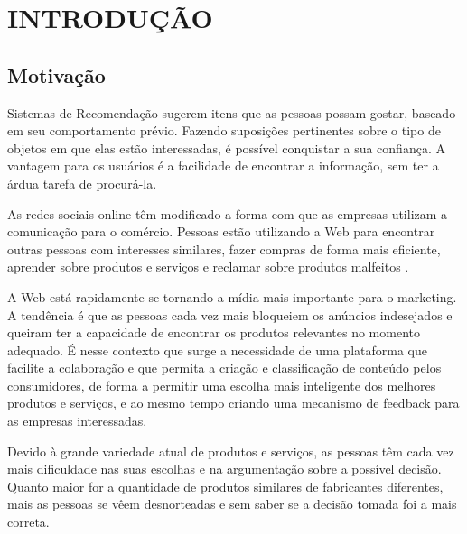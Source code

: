 \chapter{INTRODUÇÃO}  %

\section{Motivação} %
\label{sec:motivação}




 Sistemas de Recomendação sugerem itens que as pessoas possam gostar, baseado em seu comportamento prévio. Fazendo suposições pertinentes sobre o tipo de objetos em que elas estão interessadas, é possível conquistar a sua confiança. A vantagem para os usuários é a facilidade de encontrar a informação, sem ter a árdua tarefa de procurá-la.

 As redes sociais online têm modificado a forma com que as empresas utilizam a comunicação para o comércio. Pessoas estão utilizando a Web para encontrar outras pessoas com interesses similares, fazer compras de forma mais eficiente, aprender sobre produtos e serviços e reclamar sobre produtos malfeitos \cite{marketing_social_web}.

 A Web está rapidamente se tornando a mídia mais importante para o marketing. A tendência é que as pessoas cada vez mais bloqueiem os anúncios indesejados e queiram ter a capacidade de encontrar os produtos relevantes no momento adequado. É nesse contexto que surge a necessidade de uma plataforma que facilite a colaboração e que permita a criação e classificação de conteúdo pelos consumidores, de forma a permitir uma escolha mais inteligente dos melhores produtos e serviços, e ao mesmo tempo criando uma mecanismo de feedback para as empresas interessadas.

 Devido à grande variedade atual de produtos e serviços, as pessoas têm cada vez mais dificuldade nas suas escolhas e na argumentação sobre a possível decisão. Quanto maior for a quantidade de produtos similares de fabricantes diferentes, mais as pessoas se vêem desnorteadas e sem saber se a decisão tomada foi a mais correta.

